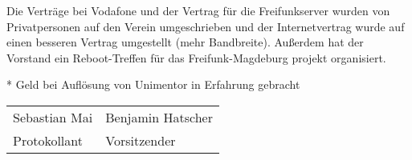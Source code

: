\documentclass[a4paper,12pt,titlepage]{scrartcl}
\begin{document}
Die Verträge bei Vodafone und der Vertrag für die Freifunkserver wurden von Privatpersonen auf den Verein umgeschrieben und der Internetvertrag wurde auf einen besseren Vertrag umgestellt (mehr Bandbreite). Außerdem hat der Vorstand ein Reboot-Treffen für das Freifunk-Magdeburg projekt organisiert.

    * Geld bei Auflösung von Unimentor in Erfahrung gebracht



\nopagebreak
\vspace{10\baselineskip}
\begin{tabularx}{\textwidth}[b]{X X}
	\hline
	Sebastian Mai  & Benjamin Hatscher \\
	Protokollant & Vorsitzender
\end{tabularx}

\appendix
%
\end{document}
